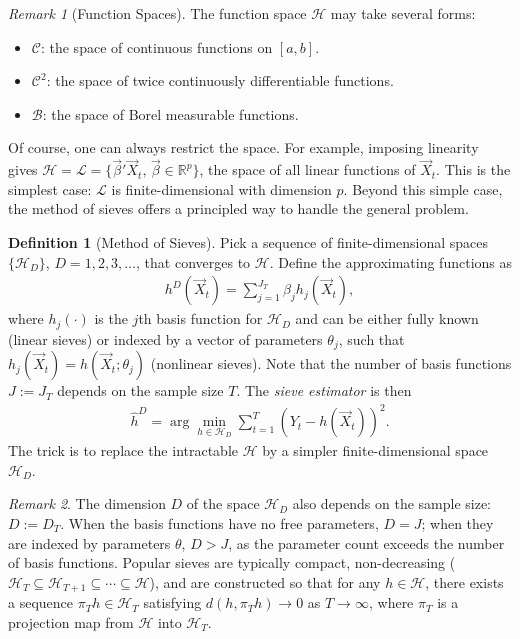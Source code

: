 \documentclass[11pt]{article}
\theoremstyle{definition}
\newtheorem{definition}{Definition}[section]
\theoremstyle{plain}
\theoremstyle{remark}
\newtheorem{remark}{Remark}[section]
\begin{document}
\begin{remark}[Function Spaces]
    The function space $\mathcal{H}$ may take several forms:
    \begin{itemize}[noitemsep]
        \item $\mathcal{C}$: the space of continuous functions on $[a,b]$.
        \item $\mathcal{C}^2$: the space of twice continuously differentiable functions.
        \item $\mathcal{B}$: the space of Borel measurable functions.
    \end{itemize}
    Of course, one can always restrict the space. For example, imposing linearity gives $\mathcal{H} = \mathcal{L} = \{\vec{\beta}'\vec{X}_t,\, \vec{\beta} \in \mathbb{R}^p\}$, the space of all linear functions of $\vec{X}_t$. This is the simplest case: $\mathcal{L}$ is finite-dimensional with dimension $p$. Beyond this simple case, the method of sieves offers a principled way to handle the general problem.
\end{remark}

\begin{definition}[Method of Sieves]
    Pick a sequence of finite-dimensional spaces $\{\mathcal{H}_D\}$, $D = 1, 2, 3, \ldots$, that converges to $\mathcal{H}$. Define the approximating functions as
    \begin{align}
        h^D(\vec{X}_t) = \sum_{j=1}^{J_T} \beta_j h_j(\vec{X}_t),
    \end{align}
    where $h_j(\cdot)$ is the $j$th basis function for $\mathcal{H}_D$ and can be either fully known (linear sieves) or indexed by a vector of parameters $\theta_j$, such that $h_j(\vec{X}_t) = h(\vec{X}_t; \theta_j)$ (nonlinear sieves). Note that the number of basis functions $J := J_T$ depends on the sample size $T$. The \textit{sieve estimator} is then
    \begin{align}
        \hat{h}^D = \arg\min_{h \in \mathcal{H}_D} \sum_{t=1}^T \left(Y_t - h(\vec{X}_t)\right)^2.
    \end{align}
    The trick is to replace the intractable $\mathcal{H}$ by a simpler finite-dimensional space $\mathcal{H}_D$.
\end{definition}

\begin{remark}
    The dimension $D$ of the space $\mathcal{H}_D$ also depends on the sample size: $D := D_T$. When the basis functions have no free parameters, $D = J$; when they are indexed by parameters $\theta$, $D > J$, as the parameter count exceeds the number of basis functions. Popular sieves are typically compact, non-decreasing ($\mathcal{H}_T \subseteq \mathcal{H}_{T+1} \subseteq \cdots \subseteq \mathcal{H}$), and are constructed so that for any $h \in \mathcal{H}$, there exists a sequence $\pi_T h \in \mathcal{H}_T$ satisfying $d(h, \pi_T h) \to 0$ as $T \to \infty$, where $\pi_T$ is a projection map from $\mathcal{H}$ into $\mathcal{H}_T$.
\end{remark}
\end{document}
